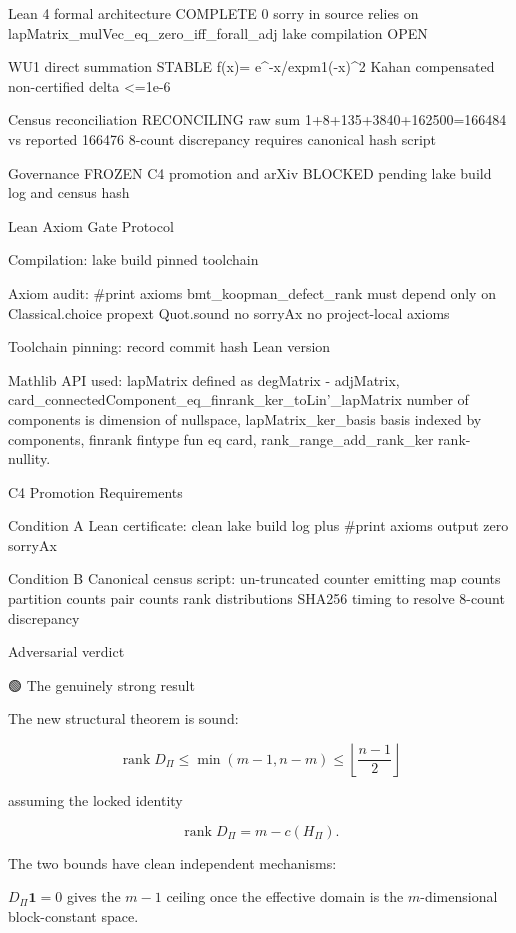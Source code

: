 Lean 4 formal architecture COMPLETE 0 sorry in source relies on lapMatrix_mulVec_eq_zero_iff_forall_adj lake compilation OPEN


WU1 direct summation STABLE f(x)= e^{-x}/expm1(-x)^2 Kahan compensated non-certified delta <=1e-6


Census reconciliation RECONCILING raw sum 1+8+135+3840+162500=166484 vs reported 166476 8-count discrepancy requires canonical hash script


Governance FROZEN C4 promotion and arXiv BLOCKED pending lake build log and census hash




Lean Axiom Gate Protocol




Compilation: lake build pinned toolchain


Axiom audit: #print axioms bmt_koopman_defect_rank must depend only on Classical.choice propext Quot.sound no sorryAx no project-local axioms


Toolchain pinning: record commit hash Lean version


Mathlib API used: lapMatrix defined as degMatrix - adjMatrix, card_connectedComponent_eq_finrank_ker_toLin'_lapMatrix number of components is dimension of nullspace, lapMatrix_ker_basis basis indexed by components, finrank fintype fun eq card, rank_range_add_rank_ker rank-nullity.




C4 Promotion Requirements




Condition A Lean certificate: clean lake build log plus #print axioms output zero sorryAx


Condition B Canonical census script: un-truncated counter emitting map counts partition counts pair counts rank distributions SHA256 timing to resolve 8-count discrepancy


Adversarial verdict


🟢 The genuinely strong result


The new structural theorem is sound:

\[
\boxed{\operatorname{rank}D_\Pi\le \min(m-1,n-m)\le  
\left\lfloor\frac{n-1}{2}\right\rfloor}  
\]

assuming the locked identity

\[
\operatorname{rank}D_\Pi=m-c(H_\Pi).  
\]

The two bounds have clean independent mechanisms:


\(D_\Pi\mathbf 1=0\) gives the \(m-1\) ceiling once the effective domain is the \(m\)-dimensional block-constant space.


